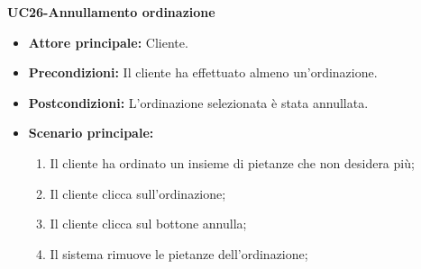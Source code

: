 
\textbf{UC26-Annullamento ordinazione}
\begin{itemize}
\item \textbf{Attore principale:} Cliente.
\item \textbf{Precondizioni:} Il cliente ha effettuato almeno un'ordinazione.
\item \textbf{Postcondizioni:} L'ordinazione selezionata è stata annullata.
\item \textbf{Scenario principale:}
\begin{enumerate}
    \item Il cliente ha ordinato un insieme di pietanze che non desidera più;
    \item Il cliente clicca sull'ordinazione;
    \item Il cliente clicca sul bottone annulla;
    \item Il sistema rimuove le pietanze dell'ordinazione;
\end{enumerate}
\end{itemize}


